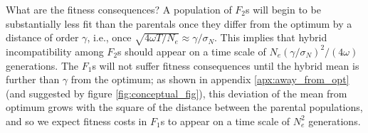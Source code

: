 \documentclass{article}
\newcommand{\1}{\mathbbm{1}}
\begin{document}

What are the fitness consequences?
A population of $F_2$s will begin to be substantially less fit than the parentals
once they differ from the optimum by a distance of order $\gamma$,
i.e., once $\sqrt{4 \omega T/N_e} \approx \gamma / \sigma_N$.
This implies that hybrid incompatibility among $F_2$s should appear on a time scale of 
$N_e (\gamma / \sigma_N)^2 / (4 \omega)$ generations.
The $F_1$s will not suffer fitness consequences until the hybrid mean is further than $\gamma$ from the optimum;
as shown in appendix \ref{apx:away_from_opt} (and suggested by figure \ref{fig:conceptual_fig}),
this deviation of the mean from optimum grows with the square of the distance between the parental populations,
and so we expect fitness costs in $F_1$s to appear on a time scale of $N_e^2$ generations.

\end{document}
